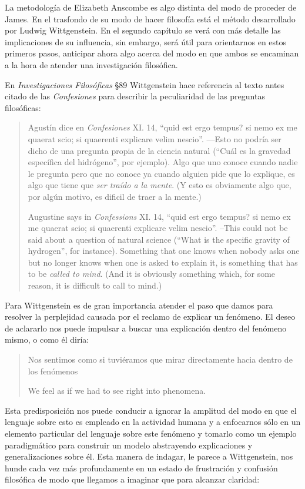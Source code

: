 La metodología de Elizabeth Anscombe es algo distinta del modo de proceder de
James. En el trasfondo de su modo de hacer filosofía está el método desarrollado
por Ludwig Wittgenstein. En el segundo capítulo se verá con más detalle las
implicaciones de su influencia, sin embargo, será útil para orientarnos en estos
primeros pasos, anticipar ahora algo acerca del modo en que ambos se encaminan a
la hora de atender una investigación filosófica.

En \emph{Investigaciones Filosóficas} \S89 Wittgenstein hace referencia al texto
antes citado de las \emph{Confesiones} para describir la peculiaridad de las
preguntas filosóficas:

\blockquote[Augustine says in \emph{Confessions} XI. 14, \enquote{quid est ergo
  tempus? si nemo ex me quaerat scio; si quaerenti explicare velim nescio}.
--This could not be said about a question of natural science (\enquote{What is
  the specific gravity of hydrogen}, for instance). Something that one knows
when nobody asks one but no longer knows when one is asked to explain it, is
something that has to be \emph{called to mind}. (And it is obviously something
which, for some reason, it is difficult to call to mind.)
{\cite[\S89]{wittgenstein1953phiinv}}]{Agustín dice en \emph{Confesiones} XI.
  14, \enquote{quid est ergo tempus? si nemo ex me quaerat scio; si quaerenti
    explicare velim nescio}. ---Esto no podría ser dicho de una pregunta propia
  de la ciencia natural (\enquote{Cuál es la gravedad específica del hidrógeno},
  por ejemplo). Algo que uno conoce cuando nadie le pregunta pero que no conoce
  ya cuando alguien pide que lo explique, es algo que tiene que \emph{ser traído
    a la mente}. (Y esto es obviamente algo que, por algún motivo, es dificil de
  traer a la mente.)}

Para Wittgenstein es de gran importancia atender el paso que damos para resolver
la perplejidad causada por el reclamo de explicar un fenómeno. El deseo de
aclararlo nos puede impulsar a buscar una explicación dentro del fenómeno mismo,
o como él diría:
\blockquote[We feel as if we had to see right into phenomena.
{\cite[\S90]{wittgenstein1953phiinv}}]{Nos sentimos como si tuviéramos que mirar
  directamente hacia dentro de los fenómenos}.
Esta predisposición nos puede conducir a ignorar la amplitud del modo en que el
lenguaje sobre esto es empleado en la actividad humana y a enfocarnos sólo en un
elemento particular del lenguaje sobre este fenómeno y tomarlo como un ejemplo
paradigmático para construir un modelo abstrayendo explicaciones y
generalizaciones sobre él. Esta manera de indagar, le parece a Wittgenstein, nos
hunde cada vez más profundamente en un estado de frustración y confusión
filosófica de modo que llegamos a imaginar que para alcanzar claridad:

